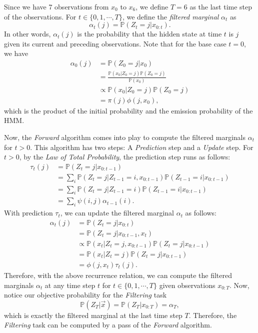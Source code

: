 \documentclass{article}
\theoremstyle{definition}
\renewcommand{\P}{\mathbb{P}}
\begin{document}
Since we have 7 observations from \(x_0\) to \(x_6\), we define \(T = 6\) as the last time step of the observations. For \(t\in \{0, 1, \cdots, T\}\), we define the \textit{filtered marginal} \(\alpha_t\) as
\[\alpha_t(j) = \P(Z_t = j | x_{0:t}).\]
In other words, \(\alpha_t(j)\) is the probability that the hidden state at time \(t\) is \(j\) given its current and preceding observations. Note that for the base case \(t=0\), we have
\begin{align*}
    \alpha_0(j) &= \P(Z_0 = j | x_0) \\
    &= \frac{\P(x_0 | Z_0 = j) \P(Z_0 = j)}{\P(x_0)} \\
    &\propto \P(x_0 | Z_0 = j) \P(Z_0 = j) \\
    &= \pi(j) \phi(j, x_0),
\end{align*}
which is the product of the initial probability and the emission probability of the HMM.

Now, the \textit{Forward} algorithm comes into play to compute the filtered marginals \(\alpha_t\) for \(t > 0\). This algorithm has two steps: A \textit{Prediction} step and a \textit{Update} step. For \(t > 0\), by the \textit{Law of Total Probability}, the prediction step runs as follows:
\begin{align*}
    \tau_t(j) &= \P(Z_t = j | x_{0:t-1}) \\
    &= \sum_i \P(Z_t = j | Z_{t-1} = i, x_{0:t-1})\P(Z_{t-1} = i | x_{0:t-1}) \\
    &= \sum_i \P(Z_t = j | Z_{t-1} = i) \P(Z_{t-1} = i | x_{0:t-1}) \\
    &= \sum_i \psi(i, j) \alpha_{t-1}(i).
\end{align*}
With prediction \(\tau_t\), we can update the filtered marginal \(\alpha_t\) as follows:
\begin{align*}
    \alpha_t(j) &= \P(Z_t = j | x_{0:t}) \\
    &= \P(Z_t = j | x_{0:t-1}, x_t) \\
    &\propto \P(x_t | Z_t = j, x_{0:t-1}) \P(Z_t = j | x_{0:t-1}) \\
    &= \P(x_t | Z_t = j) \P(Z_t = j | x_{0:t-1}) \\
    &= \phi(j, x_t) \tau_t(j).
\end{align*}
Therefore, with the above recurrence relation, we can compute the filtered marginals \(\alpha_t\) at any time step \(t\) for \(t\in \{0, 1, \cdots, T\}\) given observations \(x_{0:T}\). Now, notice our objective probability for the \textit{Filtering} task
\[\P(Z_T | \vec x) = \P(Z_T | x_{0:T}) = \alpha_T,\]
which is exactly the filtered marginal at the last time step \(T\). Therefore, the \textit{Filtering} task can be computed by a pass of the \textit{Forward} algorithm.
\end{document}
